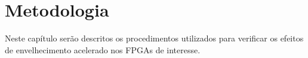 \chapter{Metodologia}
Neste capítulo serão descritos os procedimentos utilizados para verificar os efeitos de envelhecimento acelerado nos FPGAs de interesse.




